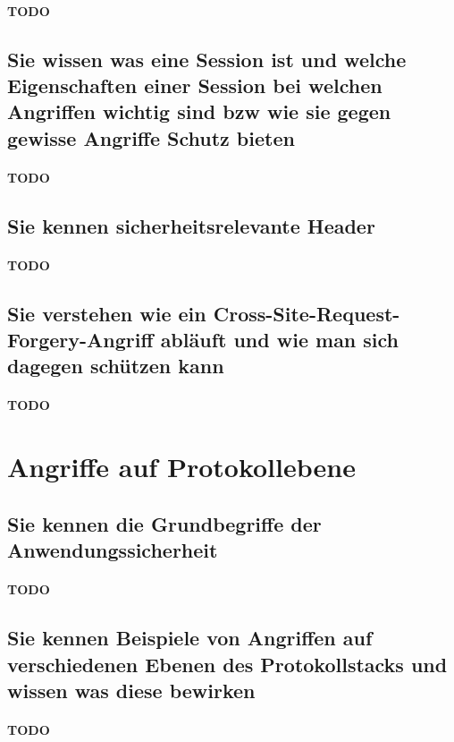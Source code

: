 \documentclass[10pt,a4paper]{article}
\begin{document}
\paragraph*{TODO}
\subsection*{Sie wissen was eine Session ist und welche Eigenschaften einer Session bei welchen Angriffen wichtig sind bzw wie sie gegen gewisse Angriffe Schutz bieten}
\paragraph*{TODO}
\subsection*{Sie kennen sicherheitsrelevante Header}
\paragraph*{TODO}
\subsection*{Sie verstehen wie ein Cross-Site-Request-Forgery-Angriff abläuft und wie man sich dagegen schützen kann}
\paragraph*{TODO}

\section{Angriffe auf Protokollebene}
\subsection*{Sie kennen die Grundbegriffe der Anwendungssicherheit}
\paragraph*{TODO}
\subsection*{Sie kennen Beispiele von Angriffen auf verschiedenen Ebenen des Protokollstacks und wissen was diese bewirken}
\paragraph*{TODO}
\end{document}
